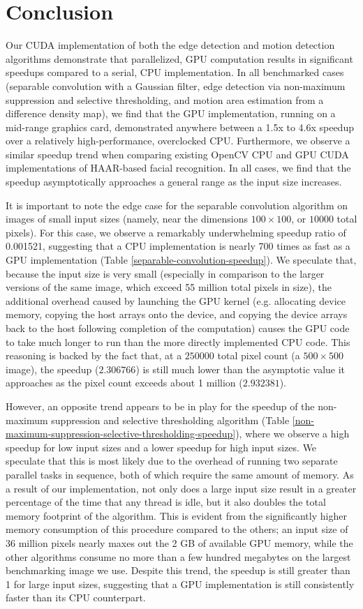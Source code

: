 \documentclass[journal]{IEEEtran}
\begin{document}
\section{Conclusion}
\label{conclusion}
Our CUDA implementation of both the edge detection and motion detection algorithms demonstrate that parallelized, GPU computation results in significant speedups compared to a serial, CPU implementation. In all benchmarked cases (separable convolution with a Gaussian filter, edge detection via non-maximum suppression and selective thresholding, and motion area estimation from a difference density map), we find that the GPU implementation, running on a mid-range graphics card, demonstrated anywhere between a 1.5x to 4.6x speedup over a relatively high-performance, overclocked CPU. Furthermore, we observe a similar speedup trend when comparing existing OpenCV CPU and GPU CUDA implementations of HAAR-based facial recognition. In all cases, we find that the speedup asymptotically approaches a general range as the input size increases.
\par It is important to note the edge case for the separable convolution algorithm on images of small input sizes (namely, near the dimensions $100 \times 100$, or $10000$ total pixels). For this case, we observe a remarkably underwhelming speedup ratio of 0.001521, suggesting that a CPU implementation is nearly 700 times as fast as a GPU implementation (Table \ref{separable-convolution-speedup}). We speculate that, because the input size is very small (especially in comparison to the larger versions of the same image, which exceed 55 million total pixels in size), the additional overhead caused by launching the GPU kernel (e.g. allocating device memory, copying the host arrays onto the device, and copying the device arrays back to the host following completion of the computation) causes the GPU code to take much longer to run than the more directly implemented CPU code. This reasoning is backed by the fact that, at a $250000$ total pixel count (a $500 \times 500$ image), the speedup ($2.306766$) is still much lower than the asymptotic value it approaches as the pixel count exceeds about 1 million ($2.932381$).
\par However, an opposite trend appears to be in play for the speedup of the non-maximum suppression and selective thresholding algorithm (Table \ref{non-maximum-suppression-selective-thresholding-speedup}), where we observe a high speedup for low input sizes and a lower speedup for high input sizes. We speculate that this is most likely due to the overhead of running two separate parallel tasks in sequence, both of which require the same amount of memory. As a result of our implementation, not only does a large input size result in a greater percentage of the time that any thread is idle, but it also doubles the total memory footprint of the algorithm. This is evident from the significantly higher memory consumption of this procedure compared to the others; an input size of 36 million pixels nearly maxes out the 2 GB of available GPU memory, while the other algorithms consume no more than a few hundred megabytes on the largest benchmarking image we use. Despite this trend, the speedup is still greater than 1 for large input sizes, suggesting that a GPU implementation is still consistently faster than its CPU counterpart.
\end{document}
